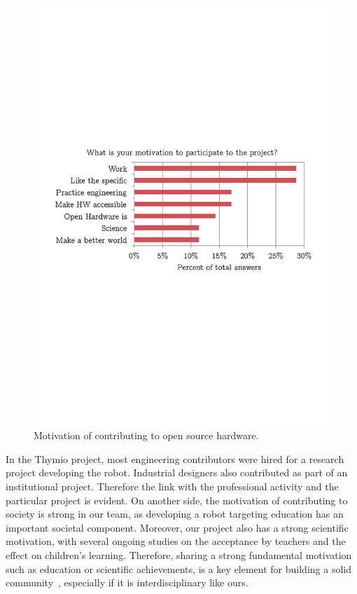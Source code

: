 \documentclass[letterpaper, 10 pt, conference]{ieeeconf}  %
\begin{document}
\begin{figure}
\centering
\includegraphics[width=\columnwidth]{figures/motivation}
\caption{Motivation of contributing to open source hardware.}
\label{fig:motivation}
\end{figure}

In the Thymio project, most engineering contributors were hired for a research project developing the robot. 
Industrial designers also contributed as part of an institutional project.
Therefore the link with the professional activity and the particular project is evident.
On another side, the motivation of contributing to society is strong in our team, as developing a robot targeting education has an important societal component.
Moreover, our project also has a strong scientific motivation, with several ongoing studies on the acceptance by teachers and the effect on children's learning.
Therefore, sharing a strong fundamental motivation such as education or scientific achievements, is a key element for building a solid community~\cite{Stahlbrost2011}, especially if it is interdisciplinary like ours.
\end{document}
